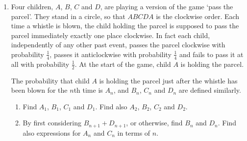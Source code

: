 \documentclass[12pt]{article}
\begin{document}
\begin{enumerate}
\item Four children, $A$, $B$, $C$ and $D$, are playing a version of the game `pass the parcel'. They stand in a circle, so that $ABCDA$ is the clockwise order. Each time a whistle is blown, the child holding the parcel is supposed to pass the parcel immediately exactly one place clockwise. In fact each child, independently of any other past event, passes the parcel clockwise with probability $\frac{1}{4}$, passes it anticlockwise with probability $\frac{1}{4}$ and fails to pass it at all with probability $\frac{1}{2}$. At the start of the game, child $A$ is holding the parcel.

The probability that child $A$ is holding the parcel just after the whistle has been blown for the $n$th time is $A_n$, and $B_n$, $C_n$ and $D_n$ are defined similarly.
\begin{enumerate}
\item Find $A_1$, $B_1$, $C_1$ and $D_1$. Find also $A_2$, $B_2$, $C_2$ and $D_2$.
\item By first considering $B_{n+1}+D_{n+1}$, or otherwise, find $B_n$ and $D_n$. Find also expressions for $A_n$ and $C_n$ in terms of $n$.
\end{enumerate}

\end{enumerate}
\end{document}
